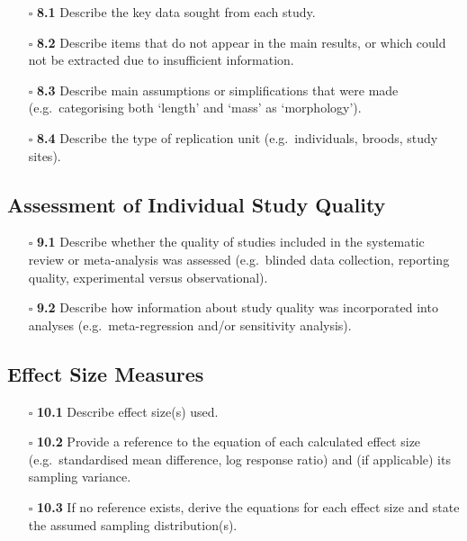 \documentclass[11pt]{article}
\def\tightlist{}
\begin{document}
\begin{Form}
\begin{itemize}
\tightlist
\item[$\square$]
  \textbf{8.1} Describe the key data sought from each study.
\item[$\square$]
  \textbf{8.2} Describe items that do not appear in the main results, or
  which could not be extracted due to insufficient information.
\item[$\square$]
  \textbf{8.3} Describe main assumptions or simplifications that were
  made (e.g.~categorising both `length' and `mass' as `morphology').
\item[$\square$]
  \textbf{8.4} Describe the type of replication unit (e.g.~individuals,
  broods, study sites).
\end{itemize}

\subsection{Assessment of Individual Study
Quality}\label{assessment-of-individual-study-quality}

\begin{itemize}
\tightlist
\item[$\square$]
  \textbf{9.1} Describe whether the quality of studies included in the
  systematic review or meta-analysis was assessed (e.g.~blinded data
  collection, reporting quality, experimental versus observational).
\item[$\square$]
  \textbf{9.2} Describe how information about study quality was
  incorporated into analyses (e.g.~meta-regression and/or sensitivity
  analysis).
\end{itemize}

\subsection{Effect Size Measures}\label{effect-size-measures}

\begin{itemize}
\tightlist
\item[$\square$]
  \textbf{10.1} Describe effect size(s) used.
\item[$\square$]
  \textbf{10.2} Provide a reference to the equation of each calculated
  effect size (e.g.~standardised mean difference, log response ratio)
  and (if applicable) its sampling variance.
\item[$\square$]
  \textbf{10.3} If no reference exists, derive the equations for each
  effect size and state the assumed sampling distribution(s).
\end{itemize}


\end{Form}
\end{document}
